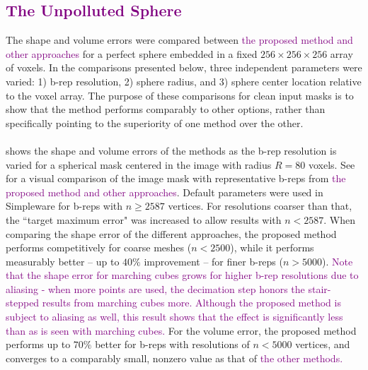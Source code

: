 \subsection{\textcolor{purple}{The Unpolluted Sphere}}
\label{The Unpolluted Sphere}

The shape and volume errors were compared between \textcolor{purple}{the proposed method and other approaches} for a perfect sphere embedded in a fixed $256 \times 256 \times 256$ array of voxels.  In the comparisons presented below, three independent parameters were varied:  1) b-rep resolution, 2) sphere radius, and 3) sphere center location relative to the voxel array. The purpose of these comparisons for clean input masks is to show that the method performs comparably to other options, rather than specifically pointing to the superiority of one method over the other. \\ \\
%
 shows the shape and volume errors of the methods as the b-rep resolution is varied for a spherical mask centered in the image with radius $R = 80$ voxels. See~ for a visual comparison of the image mask with representative b-reps from \textcolor{purple}{the proposed method and other approaches}. Default parameters were used in Simpleware for b-reps with $n \ge 2587$ vertices. For resolutions coarser than that, the ``target maximum error" was increased to allow results with $n < 2587$. When comparing the shape error of the different approaches, the proposed method performs competitively for coarse meshes ($n < 2500$), while it performs measurably better -- up to $40\%$ improvement -- for finer b-reps ($n > 5000$). \textcolor{purple}{Note that the shape error for marching cubes grows for higher b-rep resolutions due to aliasing - when more points are used, the decimation step honors the stair-stepped results from marching cubes more. Although the proposed method is subject to aliasing as well, this result shows that the effect is significantly less than as is seen with marching cubes.} For the volume error, the proposed method performs up to $70\%$ better for b-reps with resolutions of $n < 5000$ vertices, and converges to a comparably small, nonzero value as that of \textcolor{purple}{the other methods.}
